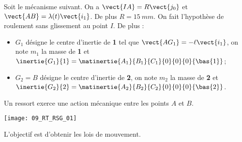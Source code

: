 \normalfalse \difficiletrue \tdifficilefalse
\correctionfalse


\setcounter{question}{0}%
\ifcorrection
\else
{}
\fi

\ifprof
\else
Soit le mécanisme suivant. On a $\vect{IA}=R\vect{j_0}$ et $\vect{AB}=\lambda(t)\vect{i_1}$. De plus $R=\SI{15}{mm}$.
On fait l'hypothèse de roulement sans glissement au point $I$. De plus :
\begin{itemize}
\item $G_1$ désigne le centre d'inertie de \textbf{1} tel que $\vect{AG_1}=-\ell\vect{i_1}$, on note $m_1$ la masse de \textbf{1} et $\inertie{G_1}{1}=\matinertie{A_1}{B_1}{C_1}{0}{0}{0}{\bas{1}}$; 
\item $G_2=B$ désigne le centre d'inertie de \textbf{2}, on note $m_2$ la masse de \textbf{2} et $\inertie{G_2}{2}=\matinertie{A_2}{B_2}{C_2}{0}{0}{0}{\bas{2}}$.
\end{itemize}
Un ressort exerce une action mécanique entre les points $A$ et $B$. 
\begin{marginfigure}
\texttt{[image: 09\_RT\_RSG\_01]}
\end{marginfigure}
\fi

L'objectif est d'obtenir les lois de mouvement. 

\ifprof
\else
\fi

\ifprof
\else
\fi


\ifprof
\else


\fi